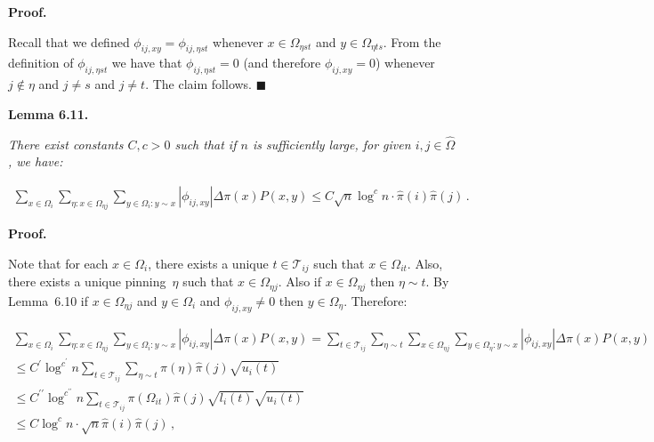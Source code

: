 \documentclass[10pt,a4paper]{article}
\begin{document}
\par\medskip\noindent\textbf{Proof.}\par



Recall that we defined $\phi_{ij,xy}=\phi_{ij,\eta st}$ whenever $x\in\Omega_{\eta st}$ and $y\in\Omega_{\eta ts}$. From the definition of $\phi_{ij,\eta st}$ we have that $\phi_{ij,\eta st}=0$ (and therefore $\phi_{ij,xy}=0$) whenever $j\notin\eta$ and $j\neq s$ and $j\neq t$. The claim follows.
\ensuremath{\blacksquare}\par






\par\medskip\noindent\textbf{\textbf{Lemma 6.11}\textbf{.}}\par



\emph{There exist constants $C,c>0$ such that if $n$ is sufficiently large, for given $i,j\in\hat{\Omega}$, we have:}\par


\[\begin{gathered}
\sum_{x\in\Omega_{i}}\sum_{\eta:x\in\Omega_{\eta j}}\sum_{y\in\Omega_{i}:y\sim x}|\phi_{ij,xy}|\Delta\pi(x)P(x,y)\leq C\sqrt{n}\log^{c}n\cdot\hat{\pi}(i)\hat{\pi}(j)\,.
\end{gathered}\]






\par\medskip\noindent\textbf{Proof.}\par



Note that for each $x\in\Omega_{i}$, there exists a unique $t\in\mathcal{T}_{ij}$ such that $x\in\Omega_{it}$. Also, there exists a unique pinning $\eta$ such that $x\in\Omega_{\eta j}$. Also if $x\in\Omega_{\eta j}$ then $\eta\sim t$. By Lemma 6.10 if $x\in\Omega_{\eta j}$ and $y\in\Omega_{i}$ and $\phi_{ij,xy}\neq 0$ then $y\in\Omega_{\eta}$. Therefore:\par


\[\begin{gathered}
\displaystyle\sum_{x\in\Omega_{i}}\sum_{\eta:x\in\Omega_{\eta j}}\sum_{y\in\Omega_{i}:y\sim x}|\phi_{ij,xy}|\Delta\pi(x)P(x,y) \displaystyle=\sum_{t\in\mathcal{T}_{ij}}\sum_{\eta\sim t}\sum_{x\in\Omega_{\eta j}}\sum_{y\in\Omega_{\eta}:y\sim x}|\phi_{ij,xy}|\Delta\pi(x)P(x,y) \\
\displaystyle\leq C^{\prime}\log^{c^{\prime}}n\sum_{t\in\mathcal{T}_{ij}}\sum_{\eta\sim t}\hat{\pi}(\eta)\hat{\pi}(j)\sqrt{u_{i}(t)} \\
\displaystyle\leq C^{\prime\prime}\log^{c^{\prime\prime}}n\sum_{t\in\mathcal{T}_{ij}}\pi(\Omega_{it})\hat{\pi}(j)\sqrt{l_{i}(t)}\sqrt{u_{i}(t)} \\
\displaystyle\leq C\log^{c}n\cdot\sqrt{n}\hat{\pi}(i)\hat{\pi}(j)\,,
\end{gathered}\]
\end{document}
